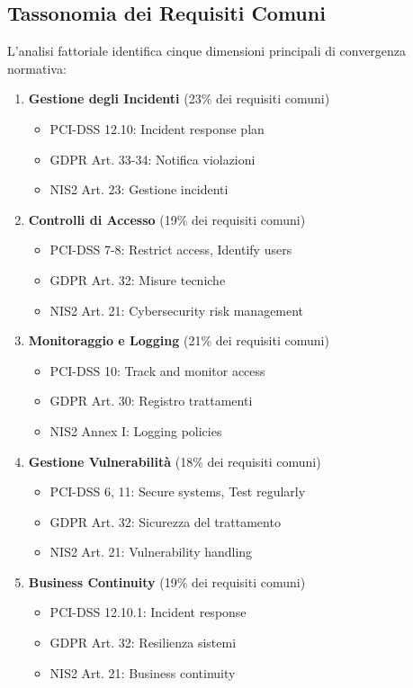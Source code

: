 \subsection{Tassonomia dei Requisiti Comuni}

L'analisi fattoriale identifica cinque dimensioni principali di convergenza normativa:

\begin{enumerate}
\item \textbf{Gestione degli Incidenti} (23\% dei requisiti comuni)
\begin{itemize}
\item PCI-DSS 12.10: Incident response plan
\item GDPR Art. 33-34: Notifica violazioni
\item NIS2 Art. 23: Gestione incidenti
\end{itemize}

\item \textbf{Controlli di Accesso} (19\% dei requisiti comuni)
\begin{itemize}
\item PCI-DSS 7-8: Restrict access, Identify users
\item GDPR Art. 32: Misure tecniche
\item NIS2 Art. 21: Cybersecurity risk management
\end{itemize}

\item \textbf{Monitoraggio e Logging} (21\% dei requisiti comuni)
\begin{itemize}
\item PCI-DSS 10: Track and monitor access
\item GDPR Art. 30: Registro trattamenti
\item NIS2 Annex I: Logging policies
\end{itemize}

\item \textbf{Gestione Vulnerabilità} (18\% dei requisiti comuni)
\begin{itemize}
\item PCI-DSS 6, 11: Secure systems, Test regularly
\item GDPR Art. 32: Sicurezza del trattamento
\item NIS2 Art. 21: Vulnerability handling
\end{itemize}

\item \textbf{Business Continuity} (19\% dei requisiti comuni)
\begin{itemize}
\item PCI-DSS 12.10.1: Incident response
\item GDPR Art. 32: Resilienza sistemi
\item NIS2 Art. 21: Business continuity
\end{itemize}
\end{enumerate}

